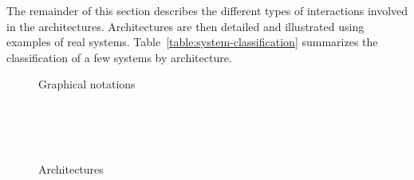 \documentclass[preprint,3p,twocolumn]{elsarticle}
\begin{document}
The remainder of this section describes the different types of
interactions involved in the architectures. Architectures are then
detailed and illustrated using examples of real
systems. Table~\ref{table:system-classification} summarizes the
classification of a few systems by architecture.


\begin{figure}
\centering
\def\svgwidth{0.7\columnwidth}

\caption{Graphical notations}
\label{fig:notations}
\end{figure}

\begin{figure}
\centering
\hspace*{0.2\columnwidth}
\hfill
{}\\
\hspace*{0.2\columnwidth}
\hfill
{}\\
\\
\caption{Architectures}
\label{fig:architectures}
\end{figure}
\end{document}
